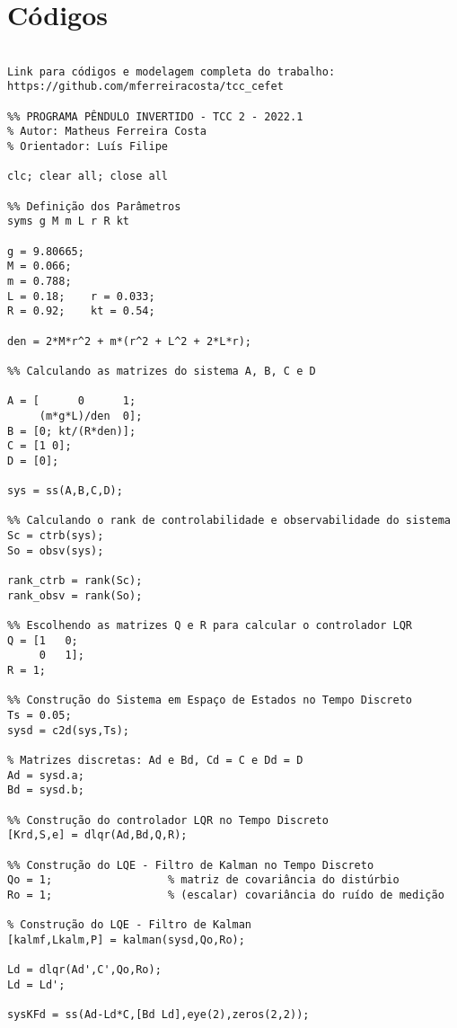 \chapter{Códigos}\label{Apendice:CodigoMatlab}

\begin{verbatim}

Link para códigos e modelagem completa do trabalho: https://github.com/mferreiracosta/tcc_cefet

%% PROGRAMA PÊNDULO INVERTIDO - TCC 2 - 2022.1
% Autor: Matheus Ferreira Costa
% Orientador: Luís Filipe 

clc; clear all; close all

%% Definição dos Parâmetros
syms g M m L r R kt

g = 9.80665;
M = 0.066;    
m = 0.788;
L = 0.18;    r = 0.033;
R = 0.92;    kt = 0.54;

den = 2*M*r^2 + m*(r^2 + L^2 + 2*L*r);

%% Calculando as matrizes do sistema A, B, C e D

A = [      0      1;
     (m*g*L)/den  0];
B = [0; kt/(R*den)];
C = [1 0];
D = [0];

sys = ss(A,B,C,D);

%% Calculando o rank de controlabilidade e observabilidade do sistema
Sc = ctrb(sys);
So = obsv(sys);

rank_ctrb = rank(Sc);
rank_obsv = rank(So);

%% Escolhendo as matrizes Q e R para calcular o controlador LQR
Q = [1   0;            
     0   1];
R = 1;

%% Construção do Sistema em Espaço de Estados no Tempo Discreto
Ts = 0.05;
sysd = c2d(sys,Ts);

% Matrizes discretas: Ad e Bd, Cd = C e Dd = D
Ad = sysd.a;
Bd = sysd.b;

%% Construção do controlador LQR no Tempo Discreto
[Krd,S,e] = dlqr(Ad,Bd,Q,R);

%% Construção do LQE - Filtro de Kalman no Tempo Discreto
Qo = 1;                  % matriz de covariância do distúrbio           
Ro = 1;                  % (escalar) covariância do ruído de medição  

% Construção do LQE - Filtro de Kalman
[kalmf,Lkalm,P] = kalman(sysd,Qo,Ro);

Ld = dlqr(Ad',C',Qo,Ro);
Ld = Ld';

sysKFd = ss(Ad-Ld*C,[Bd Ld],eye(2),zeros(2,2));

\end{verbatim}